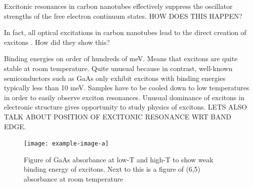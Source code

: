 Excitonic resonances in carbon nanotubes effectively suppress the oscillator strengths of the free electron continuum states. {\color{red} HOW DOES THIS HAPPEN?}

In fact, all optical excitations in carbon nanotubes lead to the direct creation of excitons \cite{wang2005optical}. How did they show this?

Binding energies on order of hundreds of meV. Means that excitons are quite stable at room temperature. Quite unusual because in contrast, well-known semiconductors such as GaAs only exhibit excitons with binding energies typically less than 10 meV. Samples have to be cooled down to low temperatures in order to easily observe exciton resonances. Unusual dominance of excitons in electronic structure gives opportunity to study physics of excitons. {\color{red} LETS ALSO TALK ABOUT POSITION OF EXCITONIC RESONANCE WRT BAND EDGE}.




\begin{figure}[h]
	\centering
	\texttt{[image: example-image-a]}
	\caption{Figure of GaAs absorbance at low-T and high-T to show weak binding energy of excitons. Next to this is a figure of  (6,5) absorbance at room temperature}
	\label{fig:gaas_vs_cnt_absorbance}
\end{figure}
